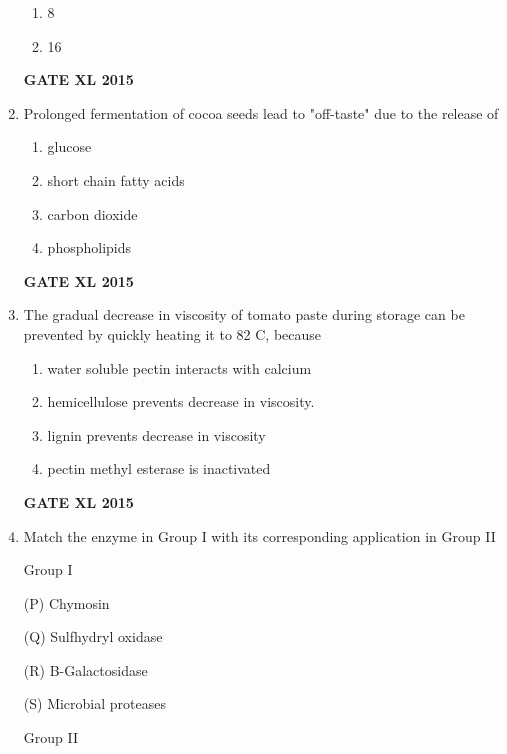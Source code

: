 \documentclass[journal,12pt,onecolumn]{IEEEtran}
\begin{document}
\begin{enumerate}
\begin{enumerate}
	    \item 8
            \item 16
    \end{enumerate}
\begin{flushright}\textbf{GATE XL 2015}\end{flushright}
\item Prolonged fermentation of cocoa seeds lead to "off-taste" due to the release of
    \begin{enumerate}
            \item glucose
	    \item short chain fatty acids 
	    \item  carbon dioxide
            \item phospholipids
    \end{enumerate}
\begin{flushright}\textbf{GATE XL 2015}\end{flushright}
\item The gradual decrease in viscosity of tomato paste during storage can be prevented by quickly heating it to 82 \celsius C, because
    \begin{enumerate}
            \item water soluble pectin interacts with calcium
	    \item hemicellulose prevents decrease in viscosity.
	    \item lignin prevents decrease in viscosity
            \item pectin methyl esterase is inactivated
    \end{enumerate}
\begin{flushright}\textbf{GATE XL 2015}\end{flushright}
\item {Match the enzyme in Group I with its corresponding application in Group II}

	\begin{minipage}{0.5\textwidth}\begin{flushleft}
Group I

(P) Chymosin

(Q) Sulfhydryl oxidase

(R) B-Galactosidase

(S) Microbial proteases
	\end{flushleft}
	\end{minipage}
	\begin{minipage}{0.5\textwidth}\begin{flushleft}
Group II


\end{flushleft}
\end{minipage}
\end{enumerate}
\end{document}
